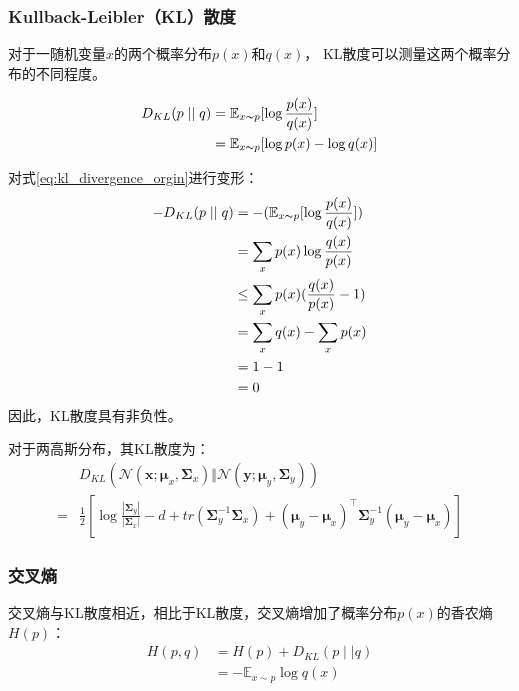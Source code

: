 \subsubsection{Kullback-Leibler（KL）散度}
对于一随机变量{$x$}的两个概率分布{$p(x)$}和{$q(x)$}，
KL散度可以测量这两个概率分布的不同程度。

\begin{align}
    D_{KL}(p \mid\mid q)
    &=\mathbb{E}_{x \thicksim p} [ \log \frac{p(x)}{q(x)} ] \label{eq:kl_divergence_orgin}\\
    &=\mathbb{E}_{x \thicksim p} [ \log p(x) -  \log q(x)] \label{eq:kl_divergence}
\end{align}

对式{\ref{eq:kl_divergence_orgin}}进行变形：
\begin{align}
    -D_{KL}(p \mid\mid q)
    &=-(\mathbb{E}_{x \thicksim p}[ \log \frac{p(x)}{q(x)} ] )\\
    &=\sum_{x} p(x) \log \frac{q(x)}{p(x)} \\
    &\leq \sum_{x} p(x) ( \frac{q(x)}{p(x)}  - 1 ) \\
    &= \sum_{x} q(x) - \sum_{x}p(x)\\
    &= 1-1\\
    &= 0 \label{eq:kl_divergence_geq_zero}
\end{align}
因此，KL散度具有非负性。 

对于两高斯分布，其KL散度为：
\begin{align}
    &D_{KL}(\mathcal{N}(\bm{x};\bm{\mu}_{x},\bm{\Sigma}_{x})\Vert \mathcal{N}(\bm{y};\bm{\mu}_{y},\bm{\Sigma}_{y}))
   \nonumber \\=& \frac{1}{2}\left[
        \log \frac{\left|  \bm{\Sigma}_{y} \right|}{\left|  \bm{\Sigma}_{x} \right|}
        -d
        +tr(\bm{\Sigma}_{y}^{-1}\bm{\Sigma}_{x})
        +{(\bm{\mu}_{y}-\bm{\mu}_{x})}^{\intercal}\bm{\Sigma}_{y}^{-1}(\bm{\mu}_{y}-\bm{\mu}_{x})
    \right] \label{eq:kl_divergence_of_two_gaussian}
\end{align}

\subsubsection{交叉熵}
交叉熵与KL散度相近，相比于KL散度，交叉熵增加了概率分布{$p(x)$}的香农熵{$H(p)$}：
\begin{align}
    H(p,q)
    &=H(p)+D_{KL}(p \mid \mid q) \\
    &=- \mathbb{E}_{x \sim p}\log q(x) \label{eq:cross_euqation}
\end{align}

